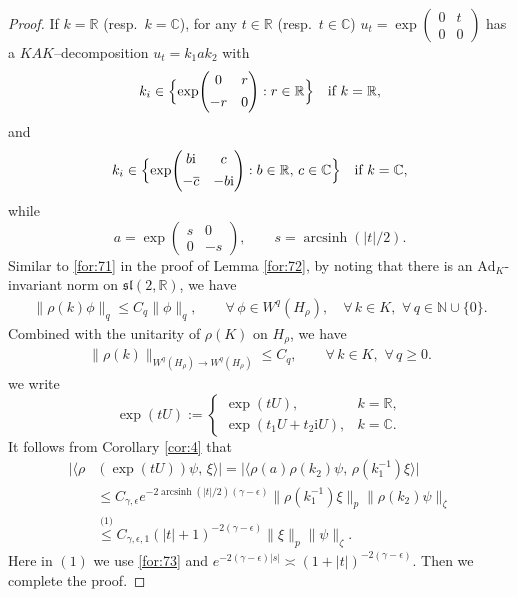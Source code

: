 \documentclass[11 pt]{amsart}
\newcommand{\NN}{\mathbb{N}}
\newcommand{\RR}{\mathbb{R}}
\newcommand{\CC}{\mathbb{C}}
\newcommand{\norm}[1]{\lVert#1\rVert}
\theoremstyle{definition}
\numberwithin{equation}{section}
\begin{document}
\begin{proof} If $k=\RR$ (resp.\ $k=\CC$), for any $t\in\RR$ (resp.\ $t\in\CC$) $u_t=\exp\!\begin{pmatrix} 0 & t \\[4pt] 0 & 0 \end{pmatrix}$
has a $KAK$–decomposition $u_t = k_1 a k_2$ with
\[
  k_i \in \Bigl\{\exp\!\begin{pmatrix} 0 & r \\[4pt] -r & 0 \end{pmatrix}
          : r\in\RR\Bigr\}\quad\text{if }k=\RR,
\]
and
\[
  k_i \in \Bigl\{\exp\!\begin{pmatrix} b\mathrm{i} & c\\[4pt] -\overline{c} &
           -b\mathrm{i} \end{pmatrix} : b\in\RR,\,c\in\CC\Bigr\}\quad\text{if }k=\CC,
\]
while
\[
  a = \exp\!\begin{pmatrix} s & 0 \\[5pt] 0 & -s \end{pmatrix},\qquad
  s=\operatorname{arcsinh}(|t|/2).
\]
Similar to \eqref{for:71} in the proof of Lemma \ref{for:72}, by noting that there is an $\text{Ad}_K$-invariant norm on $\mathfrak{sl}(2,\RR)$, we have
\begin{align*}
 \norm{\rho(k)\phi}_q\leq C_q\norm{\phi}_q,\qquad \forall\,\phi\in W^{q}(H_\rho),\quad \forall\,k\in K,\,\,\forall\,q\in\NN\cup\{0\}.
\end{align*}
Combined with the unitarity of $\rho(K)$ on $H_\rho$, we have
\begin{align}\label{for:73}
 \|\rho(k)\|_{W^{q}(H_\rho)\to W^{q}(H_\rho)}\le C_q,\qquad \forall\,k\in K,\,\,\forall\,q\geq 0.
\end{align}
we write
\[
  \exp(tU) :=
  \begin{cases}
    \exp(tU), & k=\RR,\\[4pt]
    \exp(t_1U+t_2\mathrm{i}U), & k=\CC.
  \end{cases}
\] It follows from Corollary \ref{cor:4}  that
\begin{align*}
 \Big|\big\langle \rho&(\exp(tU))\psi,\, \xi\big\rangle \Big|=\Big|\big\langle \rho(a)\rho(k_2)\psi,\, \rho(k_1^{-1})\xi\big\rangle \Big|\\
 &\leq C_{\gamma,\epsilon}e^{-2\operatorname{arcsinh}(|t|/2)(\gamma-\epsilon)}  \| \rho(k_1^{-1})\xi \|_{p} \big\|\rho(k_2)\psi\big\|_{\zeta}\\
 &\overset{\text{(1)}}{\leq} C_{\gamma,\epsilon,1}(|t|+1)^{-2(\gamma-\epsilon)}  \| \xi \|_{p} \big\|\psi\big\|_{\zeta}.
\end{align*}
Here in $(1)$ we use \eqref{for:73} and $e^{-2(\gamma-\epsilon)|s|}\asymp (1+|t|)^{-2(\gamma-\epsilon)}$.  Then we complete the proof.


\end{proof}
\end{document}
